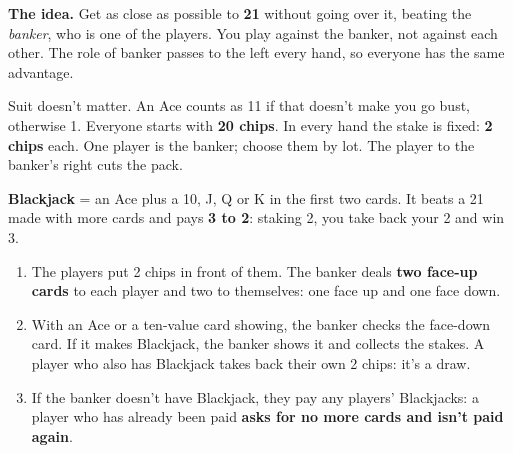 \documentclass[10pt]{article}
\begin{document}
\startpage\label{ventuno}
\textbf{The idea.} Get as close as possible to \textbf{21} without going over it, beating the \emph{banker}, who is one of the players. You play against the banker, not against each other. The role of banker passes to the left every hand, so everyone has the same advantage.
\begin{center}
\hfill
{}\hfill
{}
\end{center}
Suit doesn’t matter. An Ace counts as 11 if that doesn’t make you go bust, otherwise 1. 
Everyone starts with \textbf{20 chips}. In every hand the stake is fixed: \textbf{2 chips} each. One player is the banker; choose them by lot. The player to the banker’s right cuts the pack.
\begin{callout}
\textbf{Blackjack} = an Ace plus a 10, J, Q or K in the first two cards. It beats a 21 made with more cards and pays \textbf{3 to 2}: staking 2, you take back your 2 and win 3.
\end{callout}
\begin{enumerate}
 \item The players put 2 chips in front of them. The banker deals \textbf{two face-up cards} to each player and two to themselves: one face up and one face down.
 \item With an Ace or a ten-value card showing, the banker checks the face-down card. If it makes Blackjack, the banker shows it and collects the stakes. A player who also has Blackjack takes back their own 2 chips: it’s a draw.
 \item If the banker doesn’t have Blackjack, they pay any players’ Blackjacks: a player who has already been paid \textbf{asks for no more cards and isn’t paid again}.
\end{enumerate}
\end{document}

